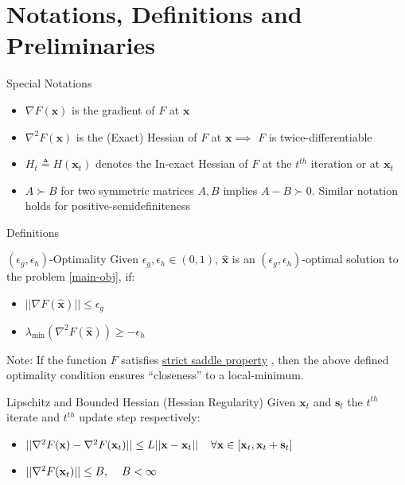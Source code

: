 \documentclass[10pt]{beamer}
\newcommand{\h}{\nabla^{2}}
\newcommand{\g}{\nabla}
\newcommand{\xbold}{\mathbf{x}}
\newcommand{\sbold}{\mathbf{s}}
\newcommand{\mineig}{\lambda_{\min}}
\newcommand{\eg}{\epsilon_{g}}
\newcommand{\eh}{\epsilon_{h}}
\begin{document}
\section{Notations, Definitions and Preliminaries}
\begin{frame}{Special Notations}
\begin{itemize}
\item<1->{\(\g F(\xbold)\) is the gradient of \(F\) at \(\xbold\)}
\item<2->{\(\h F(\xbold)\) is the (Exact) Hessian of \(F\) at \(\xbold \implies\) \(F\) is twice-differentiable}
\item<3->{\(H_{t} \triangleq H(\xbold_{t})\) denotes the In-exact Hessian of \(F\) at the \(t^{th}\) iteration or at \(\xbold_{t}\)}
\item<4->{\(A \succ B\) for two symmetric matrices \(A, B\) implies \(A - B \succ 0\). Similar notation holds for positive-semidefiniteness}
\end{itemize}
\end{frame}

\begin{frame}{Definitions}
\begin{alertblock}{\((\eg, \eh)\)-Optimality}
\label{sec-opt}
Given \(\eg, \eh \in (0, 1)\), \(\mathbf{\hat{x}}\) is an \((\eg, \eh)\)-optimal solution to the problem \ref{main-obj}, if:
\begin{itemize}
\item \(||\g F(\mathbf{\hat{x}}) || \leq \eg\)
\item \(\mineig (\h F(\mathbf{\hat{x}})) \geq -\eh\)
\end{itemize}
\end{alertblock}
\pause
Note: If the function \(F\) satisfies \underline{strict saddle property} \cite{ge-colt}, then the above defined optimality condition ensures ``closeness'' to a local-minimum.
\pause
\begin{alertblock}{Lipschitz and Bounded Hessian (Hessian Regularity)}
Given \(\xbold_{t}\) and \(\sbold_{t}\) the \(t^{th}\) iterate and \(t^{th}\) update step respectively:
\begin{itemize}
\item \(||\h F(\xbold) - \h F(\xbold_{t})|| \leq L||\xbold - \xbold_{t}|| \hspace{4mm} \forall \xbold \in [\xbold_{t}, \xbold_{t} + \sbold_{t}]\)
\item \(||\h F(\xbold_{t}) || \leq B, \hspace{4mm} B < \infty\)
\end{itemize}
\end{alertblock}
\end{frame}
\end{document}
